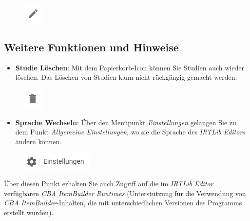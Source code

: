 \documentclass[
  letterpaper,
  DIV=11]{scrreprt}
\providecommand{\tightlist}{%
  \setlength{\itemsep}{0pt}\setlength{\parskip}{0pt}}\usepackage{longtable,booktabs,array}
\begin{document}
\begin{tcolorbox}
\begin{figure}[H]

\includegraphics{img/icon-edit.png} \hfill{}

\end{figure}

\hypertarget{weitere-funktionen-und-hinweise-1}{%
\subsection{Weitere Funktionen und
Hinweise}\label{weitere-funktionen-und-hinweise-1}}

\begin{itemize}
\tightlist
\item
  \textbf{Studie Löschen}: Mit dem Papierkorb-Icon können Sie Studien
  auch wieder löschen. Das Löschen von Studien kann nicht rückgängig
  gemacht werden:
\end{itemize}

\begin{figure}[H]

\includegraphics{img/icon-delete.png} \hfill{}

\end{figure}

\begin{itemize}
\tightlist
\item
  \textbf{Sprache Wechseln}: Über den Menüpunkt \emph{Einstellungen}
  gelangen Sie zu dem Punkt \emph{Allgemeine Einstellungen}, wo sie die
  Sprache des \emph{IRTLib Editors} ändern können.
\end{itemize}

\begin{figure}[H]

\includegraphics{img/icon-settings-DEU.png} \hfill{}

\end{figure}

Über diesen Punkt erhalten Sie auch Zugriff auf die im \emph{IRTLib
Editor} verfügbaren \emph{CBA ItemBuilder Runtimes} (Unterstützung für
die Verwendung von \emph{CBA ItemBuilder}-Inhalten, die mit
unterschiedlichen Versionen des Programms erstellt wurden).

\end{tcolorbox}
\end{document}
